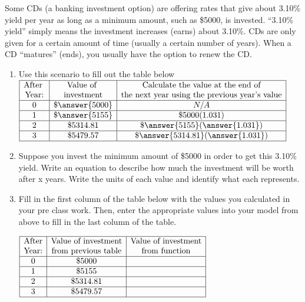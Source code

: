 \documentclass{ximera}
\begin{document}
\begin{example}
Some CDs (a banking investment option) are offering rates that give about 3.10\% yield per year as long as a minimum amount, such as \$5000, is invested.  
``3.10\% yield'' simply means the investment increases (earns) about 3.10\%.  CDs are only given for a certain amount of time (usually a certain number of years).  When a CD ``matures'' (ends), you usually have the option to renew the CD. 
\begin{enumerate}
\item Use this scenario to fill out the table below\\
$\begin{array}{|c|c|c|}
\hline
\text{After }& \text{Value of } & \text{Calculate the value at the end of} \\
\text{Year:} & \text{investment} & \text{the next year using the previous year's value} \\
\hline
0 & \$ \answer{5000} & N/A \\
\hline
1 & \$ \answer{5155} & \$ 5000(1.031) \\
\hline
2 &	\$5314.81 &	\$ \answer{5155}(\answer{1.031}) \\
\hline
3 &	\$5479.57 & \$ \answer{5314.81}(\answer{1.031})   \\
\hline
\end{array}$

\item Suppose you invest the minimum amount of \$5000 in order to get this 3.10\% yield.  Write an equation to describe how much the investment will be worth after x years.  Write the units of each value and identify what each represents.

\item Fill in the first column of the table below with the values you calculated in your pre class work.  Then, enter the appropriate values into your model from above to fill in the last column of the table.

$\begin{array}{|c|c|c|}
\hline
\text{After}& \text{Value of investment} & \text{Value of investment} \\
\text{Year:}& \text{from previous table} & \text{from function} \\
\hline
0 & \$5000 & \\
\hline
1 & \$5155 &  \\
\hline
2 &	\$5314.81 & \\
\hline
3 &	\$5479.57 &  \\
\hline
\end{array}$



\end{enumerate}
\end{example}
\end{document}
